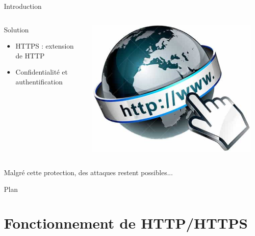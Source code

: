 \documentclass{bredelebeamer}
\begin{document}
\begin{frame}{Introduction}
\begin{columns}
\begin{column}{0.5\textwidth}
      \begin{exampleblock}{Solution}
        \begin{itemize}
        \item{HTTPS : extension de HTTP}
        \item{Confidentialité et authentification}
        \end{itemize}
      \end{exampleblock}
    \end{column}
    \begin{column}{0.5\textwidth}
      \includegraphics[width=\linewidth]{../medias/www.png}
    \end{column}
  \end{columns}

  \hspace{20cm}

  {\Large \centerline{Malgré cette protection, des attaques restent possibles...}}


\end{frame}

\begin{frame}{Plan}
  \tableofcontents
\end{frame}

\section{Fonctionnement de HTTP/HTTPS}
\end{document}
